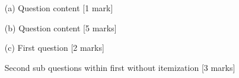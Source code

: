 \begin{itemize}

\item[(a)] Question content [1 mark]

\item[(b)]   Question content [5 marks]

\item[(c)]   First question [2 marks]

Second sub questions within first without itemization [3 marks]

\end{itemize}
